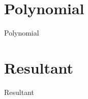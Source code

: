 \documentclass{article}
\begin{document}
\section{Polynomial}
Polynomial

\section{Resultant}
Resultant


\printindex
\end{document}
